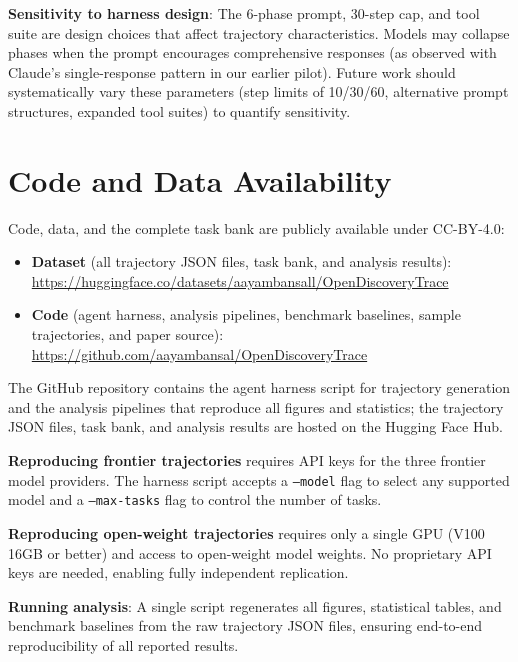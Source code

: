 \documentclass{article}
\begin{document}
\textbf{Sensitivity to harness design}: The 6-phase prompt, 30-step cap, and tool suite are design choices that affect trajectory characteristics. Models may collapse phases when the prompt encourages comprehensive responses (as observed with Claude's single-response pattern in our earlier pilot). Future work should systematically vary these parameters (step limits of 10/30/60, alternative prompt structures, expanded tool suites) to quantify sensitivity.

\section{Code and Data Availability}
\label{app:access}

Code, data, and the complete task bank are publicly available under CC-BY-4.0:
\begin{itemize}
\item \textbf{Dataset} (all trajectory JSON files, task bank, and analysis results): \url{https://huggingface.co/datasets/aayambansall/OpenDiscoveryTrace}
\item \textbf{Code} (agent harness, analysis pipelines, benchmark baselines, sample trajectories, and paper source): \url{https://github.com/aayambansal/OpenDiscoveryTrace}
\end{itemize}
The GitHub repository contains the agent harness script for trajectory generation and the analysis pipelines that reproduce all figures and statistics; the trajectory JSON files, task bank, and analysis results are hosted on the Hugging Face Hub.

\textbf{Reproducing frontier trajectories} requires API keys for the three frontier model providers. The harness script accepts a \texttt{--model} flag to select any supported model and a \texttt{--max-tasks} flag to control the number of tasks.

\textbf{Reproducing open-weight trajectories} requires only a single GPU (V100 16GB or better) and access to open-weight model weights. No proprietary API keys are needed, enabling fully independent replication.

\textbf{Running analysis}: A single script regenerates all figures, statistical tables, and benchmark baselines from the raw trajectory JSON files, ensuring end-to-end reproducibility of all reported results.
\end{document}
